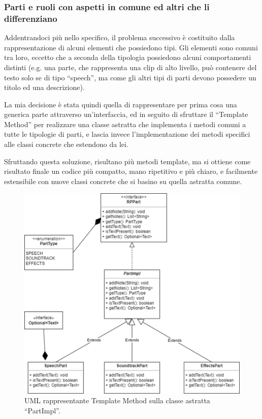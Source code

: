 \documentclass[a4paper,12pt]{report}
\begin{document}
\subsubsection{Parti e ruoli con aspetti in comune ed altri che li differenziano}
Addentrandoci più nello specifico, il problema successivo è costituito dalla rappresentazione di alcuni elementi che possiedono tipi. Gli elementi sono comuni tra loro, eccetto che a seconda della tipologia possiedono alcuni comportamenti distinti (e.g. una parte, che rappresenta una clip di alto livello, può contenere del testo solo se di tipo “speech”, ma come gli altri tipi di parti devono possedere un titolo ed una descrizione).

La mia decisione è stata quindi quella di rappresentare per prima cosa una generica parte attraverso un’interfaccia, ed in seguito di sfruttare il “Template Method” per realizzare una classe astratta che implementa i metodi comuni a tutte le tipologie di parti, e lascia invece l’implementazione dei metodi specifici alle classi concrete che estendono da lei.

Sfruttando questa soluzione, risultano più metodi template, ma si ottiene come risultato finale un codice più compatto, mano ripetitivo e più chiaro, e facilmente estensibile con nuove classi concrete che si basino su quella astratta comune.

\begin{figure}[h]
\centering{}
\includegraphics[width=\textwidth,scale=1]{img/part.png}
\caption{UML rappresentante Template Method sulla classe astratta “PartImpl”.}
\end{figure}
\end{document}
